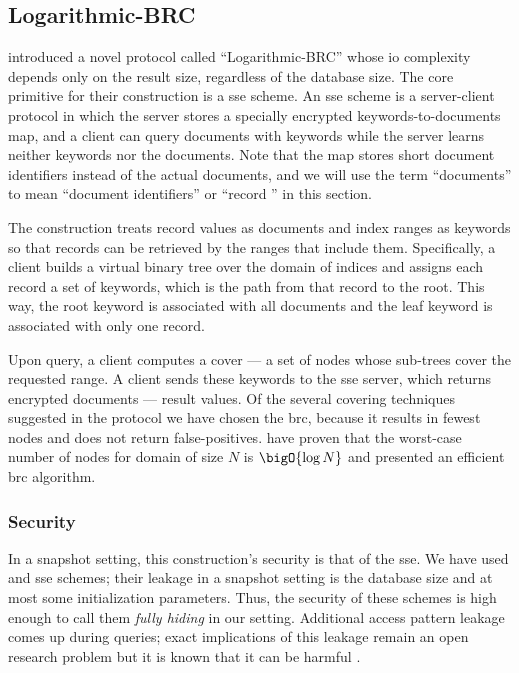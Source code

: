 \subsection{Logarithmic-BRC}

	\textcite{practical-range-search} introduced a novel protocol called ``Logarithmic-BRC'' whose \acrshort{io} complexity depends only on the result size, regardless of the database size.
	The core primitive for their construction is a \acrfull{sse} scheme.
	An \acrshort{sse} scheme is a server-client protocol in which the server stores a specially encrypted keywords-to-documents map, and a client can query documents with keywords while the server
	learns neither keywords nor the documents.
	Note that the map stores short document identifiers instead of the actual documents, and we will use the term ``documents'' to mean ``document identifiers'' or ``record '' in this section.

	The construction treats record values as documents and index ranges as keywords so that records can be retrieved by the ranges that include them.
	Specifically, a client builds a virtual binary tree over the domain of indices and assigns each record a set of keywords, which is the path from that record to the root.
	This way, the root keyword is associated with all documents and the leaf keyword is associated with only one record.

	Upon query, a client computes a cover --- a set of nodes whose sub-trees cover the requested range.
	A client sends these keywords to the \acrshort{sse} server, which returns encrypted documents --- result values.
	Of the several covering techniques suggested in the protocol \cite{practical-range-search} we have chosen the \acrfull{brc}, because it results in fewest nodes and does not return false-positives.
	\textcite{brc} have proven that the worst-case number of nodes for domain of size $N$ is $\bigO{\log N}$ and presented an efficient \acrshort{brc} algorithm.

	\subsubsection{Security}

		In a snapshot setting, this construction's security is that of the \acrshort{sse}.
		We have used \cite{cjjkrs-13} and \cite{cjjjkrs-14} \acrshort{sse} schemes; their leakage in a snapshot setting is the database size and at most some initialization parameters.
		Thus, the security of these schemes is high enough to call them \emph{fully hiding} in our setting.
		Additional access pattern leakage comes up during queries; exact implications of this leakage remain an open research problem but it is known that it can be harmful \cite{generic-attacks-kellaris}.

